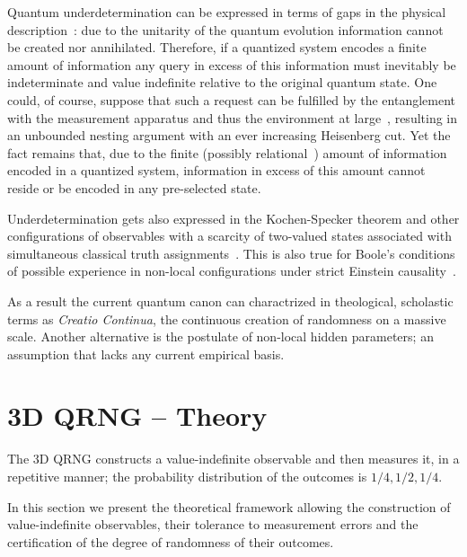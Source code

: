 \documentclass[11pt,a4paper]{article}
\begin{document}
Quantum underdetermination can be expressed in terms of gaps in the physical description~\cite[\S~III.12-14]{frank,franke}:
due to the unitarity of the quantum evolution information cannot be created nor annihilated.
Therefore, if a quantized system encodes a finite amount of information any query in excess of this information
must inevitably be indeterminate and value indefinite relative to the original quantum state.
One could, of course, suppose that such a request can be fulfilled by the entanglement
with the measurement apparatus and thus the environment at large~\cite{london-Bauer-1939,london-Bauer-1983}, resulting in an
unbounded nesting argument with an ever increasing Heisenberg cut.
Yet the fact remains that, due to the finite (possibly relational~\cite{zeil-99}) amount of information encoded in a quantized system,
information in excess of this amount cannot reside or be encoded in any pre-selected state.

Underdetermination gets also expressed in the Kochen-Specker theorem and other configurations of observables with a scarcity
of two-valued states associated with simultaneous classical truth assignments~\cite[Theorem~0]{kochen2}.
This is also true for Boole's conditions of possible experience
in non-local configurations under strict Einstein causality~\cite{wjswz-98,Zeilinger2005-kj,Zeilinger2007-mm}.

As a result the current quantum canon can charactrized in theological, scholastic terms as {\it Creatio Continua},
the continuous creation of randomness on a massive scale.
Another alternative is the postulate of non-local hidden parameters; an assumption that lacks any current empirical basis.

\section{3D QRNG -- Theory}
The 3D QRNG constructs a value-indefinite observable and then measures it, in a repetitive manner;
the probability distribution of the outcomes is $1/4, 1/2,1/4$.

In this section we present the theoretical framework allowing the construction of value-indefinite observables, their tolerance to measurement errors and the certification of the degree of randomness of their outcomes.
\end{document}
